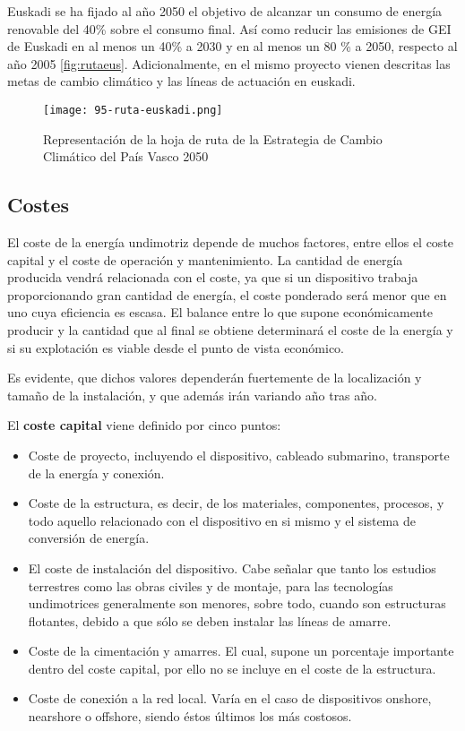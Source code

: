 Euskadi se ha fijado al año 2050 el objetivo de alcanzar un consumo de
energía renovable del 40\% sobre el consumo final. Así como reducir las
emisiones de GEI de Euskadi en al menos un 40\% a 2030 y en al menos un
80 \% a 2050, respecto al año 2005 \autoref{fig:rutaeus}. Adicionalmente, en el mismo proyecto
vienen descritas las metas de cambio climático y las líneas de actuación
en euskadi.

\begin{figure}
\centering
\texttt{[image: 95-ruta-euskadi.png]}
\caption[Hoja de ruta del País Vasco]{Representación de la hoja de ruta de la Estrategia de Cambio Climático del País Vasco 2050}
\label{fig:rutaeus}
\end{figure}

\subsection{Costes}\label{header-n204}

El coste de la energía undimotriz depende de muchos factores, entre
ellos el coste capital y el coste de operación y mantenimiento. La
cantidad de energía producida vendrá relacionada con el coste, ya que si
un dispositivo trabaja proporcionando gran cantidad de energía, el coste
ponderado será menor que en uno cuya eficiencia es escasa. El balance
entre lo que supone económicamente producir y la cantidad que al final
se obtiene determinará el coste de la energía y si su explotación es
viable desde el punto de vista económico.

Es evidente, que dichos valores dependerán fuertemente de la
localización y tamaño de la instalación, y que además irán variando año
tras año.

El \textbf{coste capital} viene definido por cinco puntos:

\begin{itemize}
\item
  Coste de proyecto, incluyendo el dispositivo, cableado submarino,
  transporte de la energía y conexión.
\item
  Coste de la estructura, es decir, de los materiales, componentes,
  procesos, y todo aquello relacionado con el dispositivo en si mismo y
  el sistema de conversión de energía.
\item
  El coste de instalación del dispositivo. Cabe señalar que tanto los
  estudios terrestres como las obras civiles y de montaje, para las
  tecnologías undimotrices generalmente son menores, sobre todo, cuando
  son estructuras flotantes, debido a que sólo se deben instalar las
  líneas de amarre.
\item
  Coste de la cimentación y amarres. El cual, supone un porcentaje
  importante dentro del coste capital, por ello no se incluye en el
  coste de la estructura.
\item
  Coste de conexión a la red local. Varía en el caso de dispositivos
  onshore, nearshore o offshore, siendo éstos últimos los más costosos.
\end{itemize}

